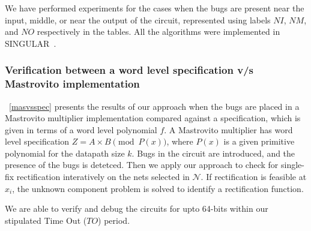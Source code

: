 We have performed experiments for the cases when the bugs  are present near 
the input, middle, or near the output of the circuit, represented
using labels $NI$, $NM$, and $NO$ respectively in the tables. All the algorithms
were implemented in SINGULAR~\cite{DGPS}. 


\subsubsection{Verification between a word level specification v/s Mastrovito implementation}
~\autoref{masvsspec} presents the results of our approach when the bugs are placed
in a Mastrovito multiplier implementation compared against a specification, which is given in terms of a word level polynomial $f$. 
A Mastrovito multiplier has word level specification $Z = A\times B \pmod{ P(x)}$, 
where $P(x)$ is a given primitive polynomial for the datapath size $k$. 
Bugs in the circuit are introduced, and the presence of the bugs is
detetced. Then we apply our approach to check for single-fix
rectification interatively on the nets selected in $\mathcal{N}$. If
rectification is feasible at $x_i$, the unknown component problem is
solved to identify a rectification function. 

We are able to verify and debug the circuits for upto 64-bits within our
stipulated Time Out ($TO$)  period.

